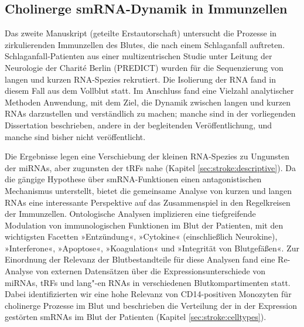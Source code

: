 \subsection{Cholinerge smRNA-Dynamik in Immunzellen}
Das zweite Manuskript (geteilte Erstautorschaft) untersucht die Prozesse in zirkulierenden Immunzellen des Blutes, die nach einem Schlaganfall auftreten.\cite{Winek2020} Schlaganfall-Patienten aus einer multizentrischen Studie unter Leitung der Neurologie der Charité Berlin (PREDICT) wurden für die Sequenzierung von langen und kurzen RNA-Spezies rekrutiert. Die Isolierung der RNA fand in diesem Fall aus dem Vollblut statt. Im Anschluss fand eine Vielzahl analytischer Methoden Anwendung, mit dem Ziel, die Dynamik zwischen langen und kurzen RNAs darzustellen und verständlich zu machen; manche sind in der vorliegenden Dissertation beschrieben, andere in der begleitenden Veröffentlichung, und manche sind bisher nicht veröffentlicht.

Die Ergebnisse legen eine Verschiebung der kleinen RNA-Spezies zu Ungunsten der miRNAs, aber zugunsten der tRFs nahe (Kapitel \ref{sec:stroke:descriptive}). Da die gängige Hypothese über smRNA-Funktionen einen antagonistischen Mechanismus unterstellt, bietet die gemeinsame Analyse von kurzen und langen RNAs eine interessante Perspektive auf das Zusammenspiel in den Regelkreisen der Immunzellen. Ontologische Analysen implizieren eine tiefgreifende Modulation von immunologischen Funktionen im Blut der Patienten, mit den wichtigsten Facetten »Entzündung«, »Cytokine« (einschließlich Neurokine), »Interferone«, »Apoptose«, »Koagulation« und »Integrität von Blutgefäßen«. Zur Einordnung der Relevanz der Blutbestandteile für diese Analysen fand eine Re-Analyse von externen Datensätzen über die Expressionsunterschiede von miRNAs, tRFs und lang"-en RNAs in verschiedenen Blutkompartimenten statt. Dabei identifizierten wir eine hohe Relevanz von CD14-positiven Monozyten für cholinerge Prozesse im Blut und beschrieben die Verteilung der in der Expression gestörten smRNAs im Blut der Patienten (Kapitel \ref{sec:stroke:celltypes}).


